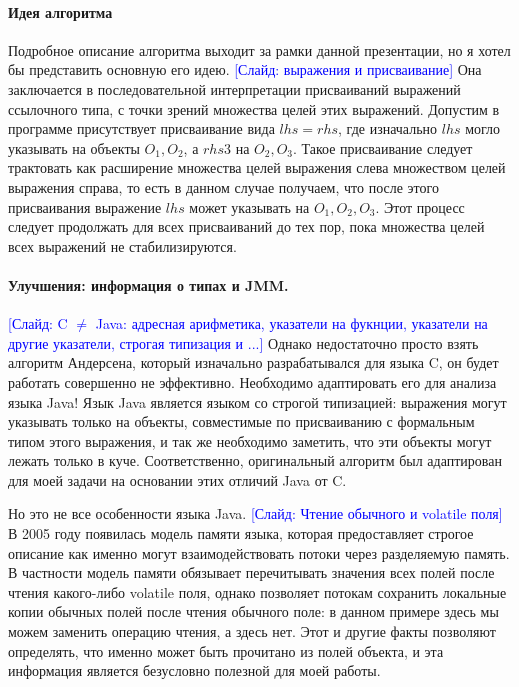 \documentclass[12pt]{article}
\newcommand{\slide}[1]{\textcolor{Blue}{[Слайд: #1]}}
\newcommand{\eng}[1]{{\English#1}}
\begin{document}
  \paragraph{Идея алгоритма}
  Подробное описание алгоритма выходит за рамки данной презентации, но я хотел
  бы представить основную его идею.
  \slide{выражения и присваивание}
  Она заключается в последовательной интерпретации присваиваний выражений
  ссылочного типа, с точки зрений множества целей этих выражений. Допустим в
  программе присутствует присваивание вида $lhs = rhs$, где изначально
  $lhs$ могло указывать на объекты $O_1, O_2$, а $rhs3$ на $O_2, O_3$. Такое
  присваивание следует трактовать как расширение множества целей выражения
  слева множеством целей выражения справа, то есть в данном случае получаем,
  что после этого присваивания выражение $lhs$ может указывать на $O_1, O_2,
  O_3$. Этот процесс следует продолжать для всех присваиваний до тех пор, пока
  множества целей всех выражений не стабилизируются.

  \paragraph{Улучшения: информация о типах и JMM.}
  \slide{C $\neq$ Java: адресная арифметика, указатели на фукнции, указатели на
  другие указатели, строгая типизация и ...}
  Однако недостаточно просто взять алгоритм Андерсена, который изначально
  разрабатывался для языка C, он будет работать совершенно не эффективно.
  Необходимо адаптировать его для анализа языка Java! Язык Java является языком
  со строгой типизацией: выражения могут указывать только на объекты,
  совместимые по присваиванию с формальным типом этого выражения, и так же
  необходимо заметить, что эти объекты могут лежать только в куче.
  Соответственно, оригинальный алгоритм был адаптирован для моей задачи на
  основании этих отличий Java от C.

  Но это не все особенности языка Java.
  \slide{Чтение обычного и \eng{volatile} поля}
  В 2005 году появилась модель памяти языка, которая предоставляет строгое
  описание как именно могут взаимодействовать потоки через разделяемую память.
  В частности модель памяти обязывает перечитывать значения всех полей после
  чтения какого-либо \eng{volatile} поля, однако позволяет потокам сохранить
  локальные копии обычных полей после чтения обычного поле: в данном примере
  здесь мы можем заменить операцию чтения, а здесь нет.
  Этот и другие факты позволяют определять, что именно может быть
  прочитано из полей объекта, и эта информация является безусловно полезной для
  моей работы.
\end{document}
